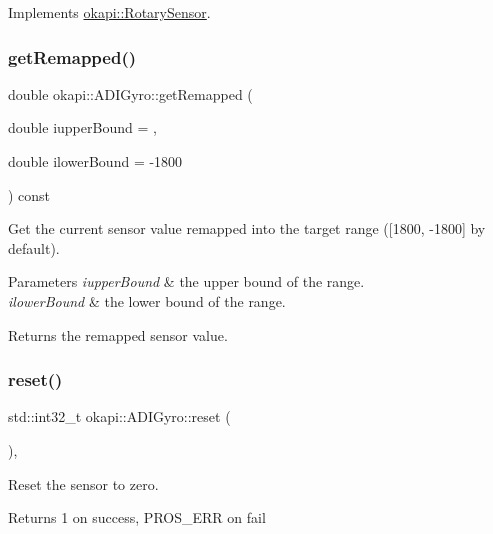 Implements \mbox{\hyperlink{classokapi_1_1RotarySensor_ac5534dc6c3bcbd8ea2f4e54a04cda734}{okapi\+::\+Rotary\+Sensor}}.

\mbox{\label{classokapi_1_1ADIGyro_a5fa8fa3653e8c2eeff81a56b80e79f7c}} 
\subsubsection{\texorpdfstring{getRemapped()}{getRemapped()}}
{\footnotesize\ttfamily double okapi\+::\+A\+D\+I\+Gyro\+::get\+Remapped (\begin{DoxyParamCaption}\item[{double}]{iupper\+Bound = {},  }\item[{double}]{ilower\+Bound = {\ttfamily -\/1800} }\end{DoxyParamCaption}) const}

Get the current sensor value remapped into the target range (\mbox{[}1800, -\/1800\mbox{]} by default).


\begin{DoxyParams}{Parameters}
{\em iupper\+Bound} & the upper bound of the range. \\
\hline
{\em ilower\+Bound} & the lower bound of the range. \\
\hline
\end{DoxyParams}
\begin{DoxyReturn}{Returns}
the remapped sensor value. 
\end{DoxyReturn}
\mbox{\label{classokapi_1_1ADIGyro_a316eec0bf6008c50fea6d1a621fd2e87}} 
\subsubsection{\texorpdfstring{reset()}{reset()}}
{\footnotesize\ttfamily std\+::int32\+\_\+t okapi\+::\+A\+D\+I\+Gyro\+::reset (\begin{DoxyParamCaption}{ }\end{DoxyParamCaption})\hspace{0.3cm}{\ttfamily [override]}, {\ttfamily [virtual]}}

Reset the sensor to zero.

\begin{DoxyReturn}{Returns}
1 on success, P\+R\+O\+S\+\_\+\+E\+RR on fail 
\end{DoxyReturn}


